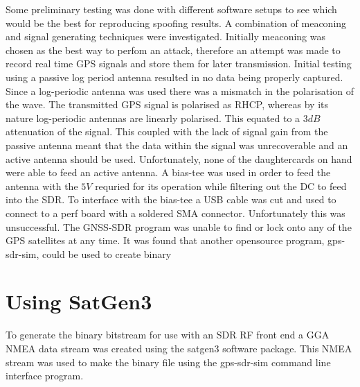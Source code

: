 Some preliminary testing was done with different software setups to see which would be the best for reproducing spoofing results. A combination of meaconing and signal
generating techniques were investigated. Initially meaconing was chosen as the best way to perfom an attack, therefore an attempt was made to record real time GPS signals
and store them for later transmission. Initial testing using a passive log period antenna resulted in no data being properly captured. Since a log-periodic antenna was
used there was a mismatch in the polarisation of the wave. The transmitted GPS signal is polarised as RHCP, whereas by its nature log-periodic antennas are linearly
polarised. This equated to a $3dB$ attenuation of the signal. This coupled with the lack of signal gain from the passive antenna meant that the data within the signal was
unrecoverable and an active antenna should be used. Unfortunately, none of the daughtercards on hand were able to feed an active antenna. A bias-tee was used in order to
feed the antenna with the $5V$ requried for its operation while filtering out the DC to feed into the SDR. To interface with the bias-tee a USB cable was cut and used to
connect to a perf board with a soldered SMA connector. Unfortunately this was unsuccessful. The GNSS-SDR program was unable to find or lock onto any of the GPS satellites
at any time. It was found that another opensource program, gps-sdr-sim, could be used to create binary 

\section{Using SatGen3}

To generate the binary bitstream for use with an SDR RF front end a GGA NMEA data stream was created using the satgen3 software package. This NMEA stream was used to make
the binary file using the gps-sdr-sim command line interface program.